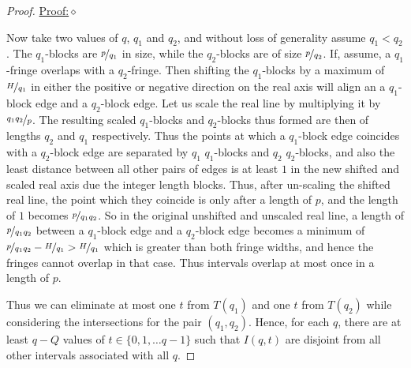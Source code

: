 \documentclass{report}
\newenvironment{claimproof}[1]{\vspace{2.5mm}\par\noindent\underline{Proof:}\space#1}{\hfill $\diamond$ \vspace{2.5mm} \par}
\begin{document}
\begin{proof}
\begin{claimproof}
\end{claimproof}
%
Now take two values of $q$, $q_1$ and $q_2$, and without loss of generality assume $q_1<q_2$. The $q_1$-blocks are $\nicefrac{p}{q_1}$ in size, while the $q_2$-blocks are of size $\nicefrac{p}{q_2}$. If, assume, a $q_1$-fringe overlaps with a $q_2$-fringe. Then shifting the $q_1$-blocks by a maximum of $\nicefrac{H}{q_1}$ in either the positive or negative direction on the real axis will align an a $q_1$-block edge and a $q_2$-block edge. Let us scale the real line by multiplying it by $\nicefrac{q_1q_2}{p}$. The resulting scaled $q_1$-blocks and $q_2$-blocks thus formed are then of lengths $q_2$ and $q_1$ respectively. Thus the points at which a $q_1$-block edge coincides with a $q_2$-block edge are separated by $q_1$ $q_1$-blocks and $q_2$ $q_2$-blocks, and also the least distance between all other pairs of edges is at least $1$ in the new shifted and scaled real axis due the integer length blocks. Thus, after un-scaling the shifted real line, the point which they coincide is only after a length of $p$, and the length of $1$ becomes $\nicefrac{p}{q_1q_2}$. So in the original unshifted and unscaled real line, a length of $\nicefrac{p}{q_1q_2}$ between a $q_1$-block edge and a $q_2$-block edge becomes a minimum of $\nicefrac{p}{q_1q_2}-\nicefrac{H}{q_1}>\nicefrac{H}{q_1}$ which is greater than both fringe widths, and hence the fringes cannot overlap in that case. Thus intervals overlap at most once in a length of $p$.

Thus we can eliminate at most one $t$ from $T(q_1)$ and one $t$ from $T(q_2)$ while considering the intersections for the pair $(q_1,q_2)$. Hence, for each $q$, there are at least $q-Q$ values of $t\in \{0,1,\ldots q-1\}$ such that $I(q,t)$ are disjoint from all other intervals associated with all $q$.

\begin{comment}
Thus the points at which a $q_1$-block edge coincides with a $q_2$-block edge are seperated by $q_1$ $q_1$-blocks and $q_2$ $q_2$-blocks. Thus, in the unscaled real line, the point which they coincide is after a length of $p$, due to rescaling by a factor of $\nicefrac{p}{q_1q_2}$. Now for $t \in \{ 0,1,...,q-1\}$, the range of all $I(q_1,t)$ is $[\nicefrac{N}{q_1}, \nicefrac{(N+pq_1)}{q_1}]$ and that of all $I(q_2,t)$ is $[\nicefrac{N}{q_2}, \nicefrac{(N+pq_2)}{q_2}]$. Since the overlapping region of the ranges is less than $p$, there can only be not more than one coincidence point. The fringes (intervals) being of maximum width $\nicefrac{H}{q_1}$, less than the least possible separation between a $q_1$-block edge and a $q_2$-block edge which are non-coinciding ($\nicefrac{p}{q_1q_2}$), the fringes cannot intersect anywhere else. %
\end{comment}


\end{proof}
\end{document}
